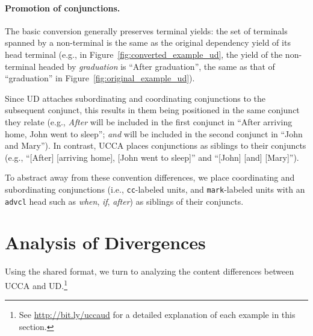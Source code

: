 \documentclass[11pt,a4paper,table]{article}
\begin{document}
\paragraph{Promotion of conjunctions.}
The basic conversion generally preserves terminal yields:
the set of terminals spanned by a non-terminal is the same
as the original dependency yield of its head terminal
(e.g., in Figure~\ref{fig:converted_example_ud}, the yield of the non-terminal
headed by \textit{graduation} is ``After graduation'', the same as that of ``graduation''
in Figure~\ref{fig:original_example_ud}).

Since UD attaches subordinating and coordinating conjunctions to the subsequent conjunct,
this results in them being positioned in the same conjunct they relate (e.g.,
\textit{After} will be included in the first conjunct in ``After arriving home, John went to sleep'';
\textit{and} will be included in the second conjunct in ``John and Mary'').
In contrast, UCCA places conjunctions as siblings to their conjuncts (e.g.,
``[After] [arriving home], [John went to sleep]'' and ``[John] [and] [Mary]''). 

To abstract away from these convention differences,
we place 
coordinating and subordinating conjunctions 
(i.e., \texttt{cc}-labeled units, and \texttt{mark}-labeled units with an \texttt{advcl} head such 
as \textit{when}, \textit{if}, \textit{after}) as siblings of their conjuncts.


\section{Analysis of Divergences}\label{sec:analysis}

Using the shared format,
we turn to analyzing the content differences between UCCA and UD.\footnote{See
\url{http://bit.ly/uccaud} for a detailed explanation of each example in
this section.}
\end{document}
